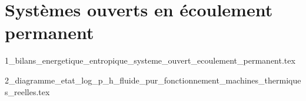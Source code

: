 \chapter{Systèmes ouverts en écoulement permanent}

\minitoc 

{1_bilans_energetique_entropique_systeme_ouvert_ecoulement_permanent.tex}

{2_diagramme_etat_log_p_h_fluide_pur_fonctionnement_machines_thermiques_reelles.tex}


